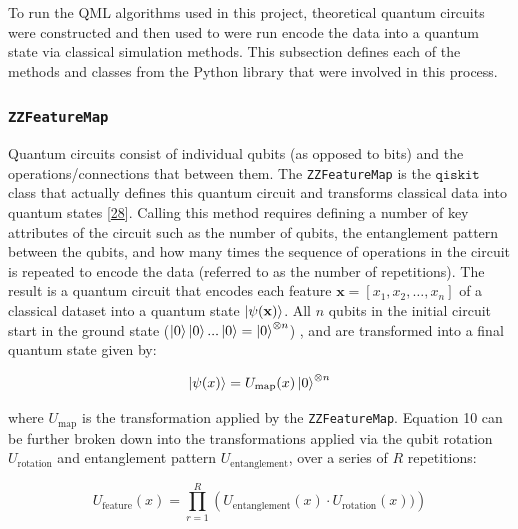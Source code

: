 \documentclass[11pt, oneside]{article}   	%
\begin{document}
To run the QML algorithms used in this project, theoretical quantum circuits were constructed and then used to were run encode the data into a quantum state via classical simulation methods.  This subsection defines each of the methods and classes from the Python library that were involved in this process. 




\subsubsection{\texttt{ZZFeatureMap}}

Quantum circuits consist of individual qubits (as opposed to bits) and the operations/connections that between them. The \texttt{ZZFeatureMap} is the $\texttt{qiskit}$ class that actually defines this quantum circuit and transforms classical data into quantum states [\href{https://doi.org/10.48550/arXiv.2405.08810}{28}]. Calling this method requires defining a number of key attributes of the circuit such as the number of qubits, the entanglement pattern between the qubits, and how many times the sequence of operations in the circuit is repeated to encode the data (referred to as the number of repetitions). The result is a quantum circuit that encodes each feature $\mathbf{x} = [x_1, x_2, \ldots, x_n]$ of a classical dataset into a quantum state $\ket{\psi(\mathbf{x})}$. All $n$ qubits in the initial circuit start in the ground state ($\ket{0} \ket{0} ... \ket{0} = \ket{0}^{\otimes n}$) , and are transformed into a final quantum state given by:

\begin{equation}
\ket{\psi(x)} = U_{\text{map}}(x)\ket{0}^{\otimes n}
\end{equation}

\noindent where $U_{\text{map}}$ is the transformation applied by the \texttt{ZZFeatureMap}. Equation 10 can be further broken down into the transformations applied via the qubit rotation $U_{\text{rotation}}$ and entanglement pattern $U_{\text{entanglement}}$, over a series of $R$ repetitions:

\begin{equation}
U_{\text{feature}}(x) = \prod_{r=1}^{R} \left( U_{\text{entanglement}}(x) \cdot U_{\text{rotation}}(x)) \right)
\end{equation}
\end{document}
